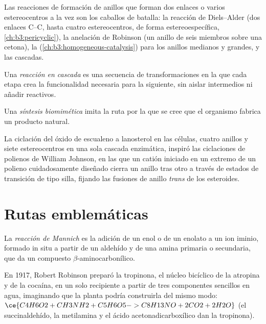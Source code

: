 Las reacciones de formación de anillos que forman dos enlaces o varios estereocentros a la vez
son los caballos de batalla: la reacción de Diels--Alder (dos enlaces C--C, hasta cuatro
estereocentros, de forma estereoespecífica, \cref{ch:b3:pericyclic}), la anelación de
Robinson (un anillo de seis miembros sobre una cetona), la 
(\cref{ch:b3:homogeneous-catalysis}) para los anillos medianos y grandes, y las cascadas.

\begin{definition}\label{def:b3:total-synthesis:cascade}
Una \emph{reacción en cascada} es una secuencia de
transformaciones en la que cada etapa crea la funcionalidad necesaria para la siguiente,
sin aislar intermedios ni añadir reactivos.
\end{definition}

\begin{definition}\label{def:b3:total-synthesis:biomimetic}
Una \emph{síntesis biomimética} imita la ruta
por la que se cree que el organismo fabrica un producto natural.
\end{definition}

La ciclación del óxido de escualeno a lanosterol en las células, cuatro anillos y siete
estereocentros en una sola cascada enzimática, inspiró las ciclaciones de polienos de
William Johnson, en las que un catión iniciado en un extremo de un polieno cuidadosamente
diseñado cierra un anillo tras otro a través de estados de transición de tipo silla, fijando
las fusiones de anillo \textit{trans} de los esteroides.

\section{Rutas emblemáticas}

\begin{definition}\label{def:b3:total-synthesis:mannich}
La \emph{reacción de Mannich} es la adición de un enol
o de un enolato a un ion iminio, formado in situ a partir de un aldehído y de una amina primaria o
secundaria, que da un compuesto $\beta$-aminocarbonílico.
\end{definition}

En 1917, Robert Robinson preparó la tropinona, el núcleo bicíclico de la atropina y de la
cocaína, en un solo recipiente a partir de tres componentes sencillos en agua, imaginando que la
planta podría construirla del mismo modo:
$\ce{C4H6O2 + CH3NH2 + C5H6O5 -> C8H13NO + 2CO2 + 2H2O}$ (el succinaldehído, la metilamina y el
ácido acetonadicarboxílico dan la tropinona).

